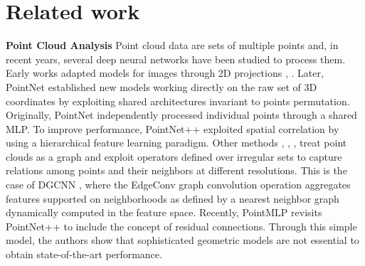 \documentclass{article}
\begin{document}
\section{Related work}
\label{sec:related}

\textbf{Point Cloud Analysis} Point cloud data are sets of multiple points and, in recent years, several deep neural networks have been studied to process them. Early works adapted models for images through 2D projections \cite{you2018pvnet}, \cite{li2020end}. Later, PointNet \cite{qi2017pointnet} established new models working directly on the raw set of 3D coordinates by exploiting shared architectures invariant to points permutation. Originally, PointNet independently processed individual points through a shared MLP. To improve performance, PointNet++ \cite{qi2017pointnet++} exploited spatial correlation by using a hierarchical feature learning paradigm.
Other methods \cite{liu2019relation}, \cite{wu2019pointconv}, \cite{li2018pointcnn}, treat point clouds as a graph and exploit operators defined over irregular sets to capture relations among points and their neighbors at different resolutions. This is the case of DGCNN \cite{wang2019dynamic}, where the EdgeConv graph convolution operation aggregates features supported on neighborhoods as defined by a nearest neighbor graph dynamically computed in the feature space.
Recently, PointMLP \cite{ma2022rethinking} revisits PointNet++ to include the concept of residual connections. Through this simple model, the authors show that sophisticated geometric models are not essential to obtain state-of-the-art performance. 
\end{document}
